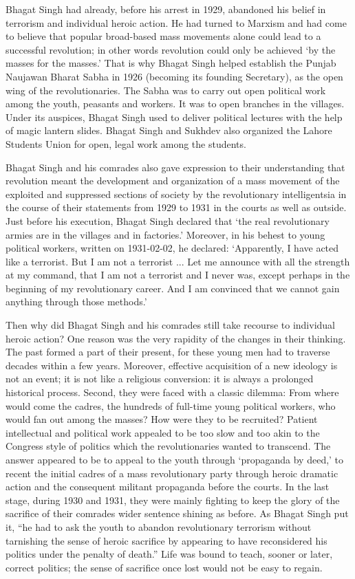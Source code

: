 \begin{multicols}{2}
Bhagat Singh had already, before his arrest in 1929, abandoned his belief in terrorism and individual heroic action. He had turned to Marxism and had come to believe that popular broad-based mass movements alone could lead to a successful revolution; in other words revolution could only be achieved `by the masses for the masses.' That is why Bhagat Singh helped establish the Punjab Naujawan Bharat Sabha in 1926 (becoming its founding Secretary), as the open wing of the revolutionaries. The Sabha was to carry out open political work among the youth, peasants and workers. It was to open branches in the villages. Under its auspices, Bhagat Singh used to deliver political lectures with the help of magic lantern slides. Bhagat Singh and Sukhdev also organized the Lahore Students Union for open, legal work among the students.

Bhagat Singh and his comrades also gave expression to their understanding that revolution meant the development and organization of a mass movement of the exploited and suppressed sections of society by the revolutionary intelligentsia in the course of their statements from 1929 to 1931 in the courts as well as outside. Just before his execution, Bhagat Singh declared that `the real revolutionary armies are in the villages and in factories.' Moreover, in his behest to young political workers, written on 1931-02-02, he declared: `Apparently, I have acted like a terrorist. But I am not a terrorist ... Let me announce with all the strength at my command, that I am not a terrorist and I never was, except perhaps in the beginning of my revolutionary career. And I am convinced that we cannot gain anything through those methods.'

Then why did Bhagat Singh and his comrades still take recourse to individual heroic action? One reason was the very rapidity of the changes in their thinking. The past formed a part of their present, for these young men had to traverse decades within a few years. Moreover, effective acquisition of a new ideology is not an event; it is not like a religious conversion: it is always a prolonged historical process. Second, they were faced with a classic dilemma: From where would come the cadres, the hundreds of full-time young political workers, who would fan out among the masses? How were they to be recruited? Patient intellectual and political work appealed to be too slow and too akin to the Congress style of politics which the revolutionaries wanted to transcend. The answer appeared to be to appeal to the youth through `propaganda by deed,' to recent the initial cadres of a mass revolutionary party through heroic dramatic action and the consequent militant propaganda before the courts. In the last stage, during 1930 and 1931, they were mainly fighting to keep the glory of the sacrifice of their comrades wider sentence shining as before. As Bhagat Singh put it, ``he had to ask the youth to abandon revolutionary terrorism without tarnishing the sense of heroic sacrifice by appearing to have reconsidered his politics under the penalty of death.'' Life was bound to teach, sooner or later, correct politics; the sense of sacrifice once lost would not be easy to regain.


\end{multicols}
